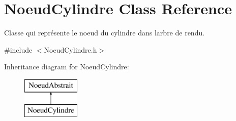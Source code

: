 \hypertarget{class_noeud_cylindre}{}\section{Noeud\+Cylindre Class Reference}
\label{class_noeud_cylindre}


Classe qui représente le noeud du cylindre dans l\textquotesingle{}arbre de rendu.  




{\ttfamily \#include $<$Noeud\+Cylindre.\+h$>$}

Inheritance diagram for Noeud\+Cylindre\+:\begin{figure}[H]
\begin{center}
\leavevmode
\includegraphics[height=2.000000cm]{class_noeud_cylindre}
\end{center}
\end{figure}

